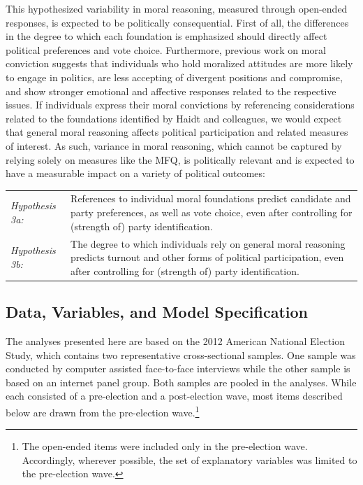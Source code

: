 \documentclass[12pt]{article}
\begin{document}
This hypothesized variability in moral reasoning, measured through open-ended responses, is expected to be politically consequential. First of all, the differences in the degree to which each foundation is emphasized should directly affect political preferences and vote choice. Furthermore, previous work on moral conviction suggests that individuals who hold moralized attitudes are more likely to engage in politics, are less accepting of divergent positions and compromise, and show stronger emotional and affective responses related to the respective issues. If individuals express their moral convictions by referencing considerations related to the foundations identified by Haidt and colleagues, we would expect that general moral reasoning affects political participation and related measures of interest. As such, variance in moral reasoning, which cannot be captured by relying solely on measures like the MFQ, is politically relevant and is expected to have a measurable impact on a variety of political outcomes:

\vspace{0.3cm}
\begin{tabular}{lp{12cm}}
\textsl{Hypothesis 3a:} & References to individual moral foundations predict candidate and party preferences, as well as vote choice, even after controlling for (strength of) party identification. \\
\textsl{Hypothesis 3b:} & The degree to which individuals rely on general moral reasoning predicts turnout and other forms of political participation, even after controlling for (strength of) party identification.
\end{tabular}
\vspace{0.5cm}


\subsection{Data, Variables, and Model Specification}

The analyses presented here are based on the 2012 American National Election Study, which contains two representative cross-sectional samples. One sample was conducted by computer assisted face-to-face interviews while the other sample is based on an internet panel group. Both samples are pooled in the analyses. While each consisted of a pre-election and a post-election wave, most items described below are drawn from the pre-election wave.\footnote{The open-ended items were included only in the pre-election wave. Accordingly, wherever possible, the set of explanatory variables was limited to the pre-election wave.}
\end{document}
